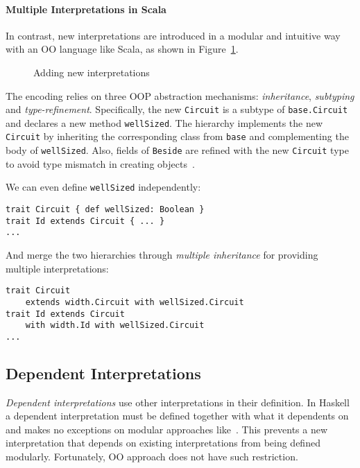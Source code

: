 \paragraph{Multiple Interpretations in Scala}
In contrast, new interpretations are introduced in a 
modular and intuitive way with an OO language like Scala, as shown in Figure~\ref{code:operation}.
\begin{figure}
\caption{Adding new interpretations}
\label{code:operation}
\end{figure}
The encoding relies on three OOP abstraction mechanisms:
\emph{inheritance}, \emph{subtyping} and \emph{type-refinement}.
Specifically, the new \lstinline{Circuit} is a subtype of
\lstinline{base.Circuit} and declares a new method \lstinline{wellSized}.
The hierarchy implements the new \lstinline{Circuit} by inheriting the corresponding class
from \lstinline{base} and
complementing the body of \lstinline{wellSized}.
Also, fields of \lstinline{Beside} are refined with the new \lstinline{Circuit} type
to avoid type mismatch in creating objects~\cite{eptrivially16}.

We can even define \lstinline{wellSized} independently:
\begin{lstlisting}
trait Circuit { def wellSized: Boolean }
trait Id extends Circuit { ... }
...
\end{lstlisting}
And merge the two hierarchies through \emph{multiple inheritance} for providing
multiple interpretations:
\begin{lstlisting}
trait Circuit
    extends width.Circuit with wellSized.Circuit
trait Id extends Circuit
    with width.Id with wellSized.Circuit
...
\end{lstlisting}

\subsection{Dependent Interpretations}
 \emph{Dependent interpretations} use other interpretations in their definition.
In Haskell a dependent interpretation must be defined together with what it
dependents on and makes no exceptions on modular approaches like~\cite{}.
This prevents a new interpretation that depends on existing
interpretations from being defined modularly.
Fortunately, OO approach does not have such restriction.

